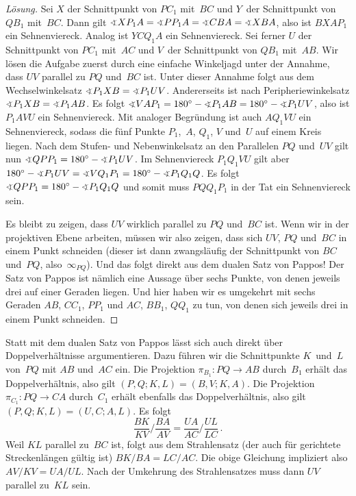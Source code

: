\begin{proof}[Lösung]
	Sei $X$ der Schnittpunkt von $PC_1$ mit~$BC$ und $Y$~der Schnittpunkt von $QB_1$ mit~$BC$. Dann gilt $\winkel XP_1A=\winkel PP_1A=\winkel CBA=\winkel XBA$, also ist $BXAP_1$ ein Sehnenviereck. Analog ist $YCQ_1A$ ein Sehnenviereck. Sei ferner $U$ der Schnittpunkt von $PC_1$ mit~$AC$ und $V$~der Schnittpunkt von $QB_1$ mit~$AB$. Wir lösen die Aufgabe zuerst durch eine einfache Winkeljagd unter der Annahme, dass $UV$ parallel zu $PQ$ und~$BC$ ist. Unter dieser Annahme folgt aus dem Wechselwinkelsatz $\winkel P_1XB=\winkel P_1UV$. Andererseits ist nach Peripheriewinkelsatz $\winkel P_1XB=\winkel P_1AB$. Es folgt $\winkel VAP_1=180^\circ -\winkel P_1AB=180^\circ -\winkel P_1UV$, also ist $P_1AVU$ ein Sehnenviereck. Mit analoger Begründung ist auch $AQ_1VU$ ein Sehnenviereck, sodass die fünf Punkte $P_1$,~$A$, $Q_1$, $V$ und~$U$ auf einem Kreis liegen. Nach dem Stufen- und Nebenwinkelsatz an den Parallelen $PQ$ und~$UV$ gilt nun $\winkel QPP_1=180^\circ-\winkel P_1UV$. Im Sehnenviereck $P_1Q_1VU$ gilt aber $180^\circ-\winkel P_1UV=\winkel VQ_1P_1=180^\circ-\winkel P_1Q_1Q$. Es folgt $\winkel QPP_1=180^\circ-\winkel P_1Q_1Q$ und somit muss $PQQ_1P_1$ in der Tat ein Sehnenviereck sein.
	
	Es bleibt zu zeigen, dass $UV$ wirklich parallel zu $PQ$ und~$BC$ ist. Wenn wir in der projektiven Ebene arbeiten, müssen wir also zeigen, dass sich $UV$, $PQ$ und~$BC$ in einem Punkt schneiden (dieser ist dann zwangsläufig der Schnittpunkt von $BC$ und~$PQ$, also~$\infty_{PQ}$). Und das folgt direkt aus dem dualen Satz von Pappos! Der Satz von Pappos ist nämlich eine Aussage über sechs Punkte, von denen jeweils drei auf einer Geraden liegen. Und hier haben wir es umgekehrt mit sechs Geraden $AB$, $CC_1$, $PP_1$ und $AC$, $BB_1$, $QQ_1$ zu tun, von denen sich jeweils drei in einem Punkt schneiden.
\end{proof}

Statt mit dem dualen Satz von Pappos lässt sich auch direkt über Doppelverhältnisse argumentieren. Dazu führen wir die Schnittpunkte $K$~und~$L$ von~$PQ$ mit $AB$ und~$AC$ ein. Die Projektion $\pi_{B_1}\colon PQ\to AB$ durch~$B_1$ erhält das Doppelverhältnis, also gilt $(P,Q;K,L)=(B,V;K,A)$. Die Projektion $\pi_{C_1}\colon PQ\to CA$ durch~$C_1$ erhält ebenfalls das Doppelverhältnis, also gilt $(P,Q;K,L)=(U,C;A,L)$. Es folgt
\begin{equation*}
	\frac{BK}{KV}\bigg/\frac{BA}{AV}=\frac{UA}{AC}\bigg/\frac{UL}{LC}\,.
\end{equation*}
Weil $KL$ parallel zu~$BC$ ist, folgt aus dem Strahlensatz (der auch für gerichtete Streckenlängen gültig ist) $BK/BA=LC/AC$.
Die obige Gleichung impliziert also $AV/KV=UA/UL$. Nach der Umkehrung des Strahlensatzes muss dann $UV$ parallel zu~$KL$ sein.

